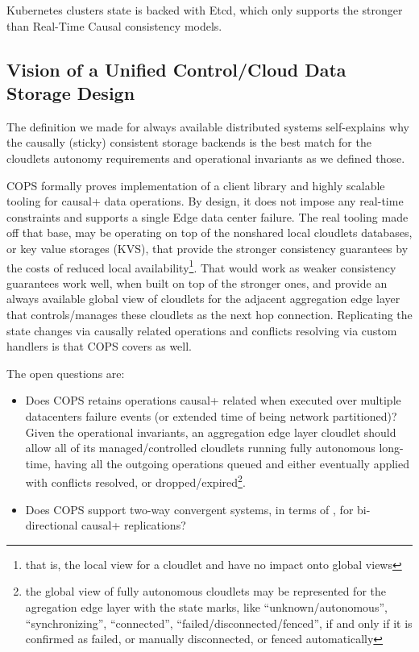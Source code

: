 \documentclass[conference]{IEEEtran}
\begin{document}
Kubernetes clusters state is backed with Etcd, which only supports the stronger
than Real-Time Causal consistency models.

\subsection{Vision of a Unified Control/Cloud Data Storage Design}

The definition we made for always available distributed systems self-explains
why the causally (sticky) consistent storage backends is the best match for the
cloudlets autonomy requirements and operational invariants as we defined those.

COPS formally proves implementation of a client library and highly scalable
tooling for causal+ data operations. By design, it does not impose any
real-time constraints and supports a single Edge data center failure. The real
tooling made off that base, may be operating on top of the nonshared local cloudlets
databases, or key value storages (KVS), that provide the stronger consistency
guarantees by the costs of reduced local availability\footnote{that is, the local view
for a cloudlet and have no impact onto global views}. That would
work as weaker consistency guarantees work well, when built on top of the
stronger ones, and provide an always available global view of cloudlets for the
adjacent aggregation edge layer that controls/manages these cloudlets as the
next hop connection. Replicating the state changes via causally related operations
and conflicts resolving via custom handlers is that COPS covers as well.

The open questions are:
\begin{itemize}
  \item Does COPS retains operations causal+ related when executed over
    multiple datacenters failure events (or extended time of being network
    partitioned)? Given the operational invariants, an aggregation edge layer
    cloudlet should allow all of its managed/controlled cloudlets running fully
    autonomous long-time, having all the outgoing operations queued and either
    eventually applied with conflicts resolved, or dropped/expired\footnote{the
    global view of fully autonomous cloudlets may be represented for the
    agregation edge layer with the state marks, like ``unknown/autonomous'',
    ``synchronizing'', ``connected'', ``failed/disconnected/fenced'', if and
    only if it is confirmed as failed, or manually disconnected, or fenced
    automatically}.
  \item Does COPS support two-way convergent systems, in terms of \cite{b2},
    for bi-directional causal+ replications?
\end{itemize}
\end{document}
